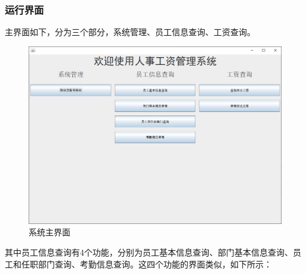 \documentclass[withoutpreface,bwprint]{cumcmthesis} %
\begin{document}
\subsubsection{运行界面}
主界面如下，分为三个部分，系统管理、员工信息查询、工资查询。
\begin{figure}[H]
    \centering
    \includegraphics[width=0.8\linewidth]{main}
    \caption{系统主界面}
\end{figure}
其中员工信息查询有4个功能，分别为员工基本信息查询、部门基本信息查询、员工和任职部门查询、考勤信息查询。这四个功能的界面类似，如下所示：
\end{document}
